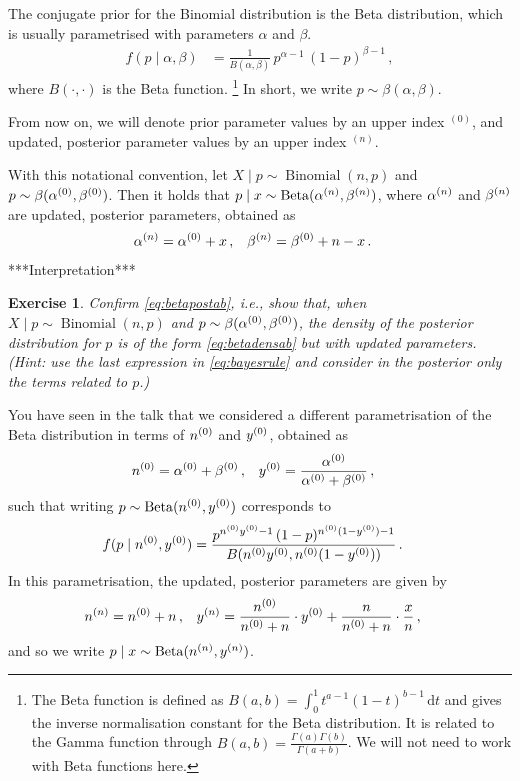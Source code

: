 \documentclass[12pt,a4paper	,twoside]{article}
\newcommand{\dd}{\,\mathrm{d}}
\newcommand{\uz}{^{(0)}} %
\newcommand{\un}{^{(n)}} %
\newcommand{\bin}{\operatorname{Binomial}}
\newcommand{\be}{\operatorname{Beta}}
\newtheorem{myex}{Exercise}
\begin{document}
The conjugate prior for the Binomial distribution is the Beta distribution,
which is usually parametrised with parameters $\alpha$ and $\beta$.
\begin{align}
f(p\mid\alpha,\beta) &= \frac{1}{B(\alpha,\beta)}\, p^{\alpha-1}\, (1-p)^{\beta-1}\,,
\label{eq:betadensab}
\end{align}
where $B(\cdot,\cdot)$ is the Beta function.%
\footnote{The Beta function is defined as $B(a,b) = \int_0^1 t^{a-1} (1-t)^{b-1} \dd t$
and gives the inverse normalisation constant for the Beta distribution.
It is related to the Gamma function through $B(a,b) = \frac{\Gamma(a)\Gamma(b)}{\Gamma(a+b)}$.
We will not need to work with Beta functions here.}
In short, we write $p \sim \beta(\alpha,\beta)$.

From now on, we will denote prior parameter values by an upper index ${}\uz$,
and updated, posterior parameter values by an upper index ${}\un$.

With this notational convention,
let $X\mid p \sim \bin(n,p)$ and $p \sim \beta(\az,\bz)$.
Then it holds that $p \mid x \sim \be(\an,\bn)$,
where $\an$ and $\bn$ are updated, posterior parameters, obtained as
\begin{align}
\an &= \az + x\,, & \bn &= \bz + n - x \,.
\label{eq:betapostab}
\end{align}
***Interpretation***

\begin{myex}
Confirm \eqref{eq:betapostab}, i.e.,
show that, when $X\mid p \sim \bin(n,p)$ and $p \sim \beta(\az,\bz)$,
the density of the posterior distribution for $p$ is of the form \eqref{eq:betadensab}
but with updated parameters.
(Hint: use the last expression in \eqref{eq:bayesrule}
and consider in the posterior only the terms related to $p$.)
\end{myex}

You have seen in the talk that we considered a different parametrisation of the Beta distribution
in terms of $\nz$ and $\yz$, obtained as
\begin{align}
\nz &= \az + \bz\,, & \yz &= \frac{\az}{\az+\bz}\,,
\label{eq:betareparam}
\end{align}
such that writing $p \sim \be(\nz,\yz)$ corresponds to
\begin{align}
f(p\mid\nz,\yz) &= \frac{p^{\nz\yz-1}\, (1-p)^{\nz(1-\yz)-1}}{B(\nz\yz,\nz(1-\yz))}\,.
\label{eq:betadensny}
\end{align}
In this parametrisation, the updated, posterior parameters are given by
\begin{align}
\nn &= \nz + n\,, &
\yn &= \frac{\nz}{\nz + n} \cdot \yz + \frac{n}{\nz + n} \cdot \frac{x}{n}\,,
\label{eq:betapostny}
\end{align}
and so we write $p\mid x \sim \be(\nn,\yn)$.
\end{document}
